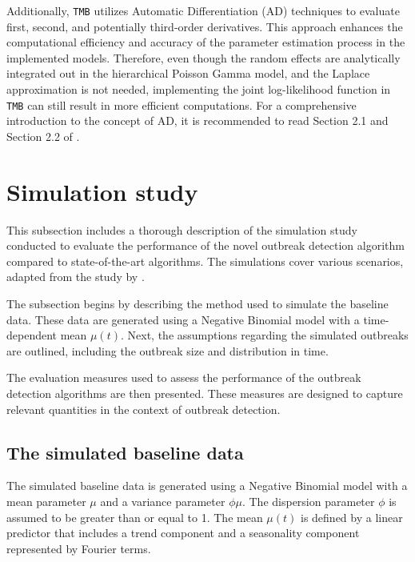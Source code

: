 \documentclass[preprint, 3p, authoryear]{elsarticle} %
\begin{document}
Additionally, \texttt{TMB} utilizes Automatic Differentiation (AD) techniques \citep{Griewank_2008} to evaluate first, second, and potentially third-order derivatives. This approach enhances the computational efficiency and accuracy of the parameter estimation process in the implemented models. Therefore, even though the random effects are analytically integrated out in the hierarchical Poisson Gamma model, and the Laplace approximation is not needed, implementing the joint log-likelihood function in \texttt{TMB} can still result in more efficient computations. For a comprehensive introduction to the concept of AD, it is recommended to read Section 2.1 and Section 2.2 of \citet{Fournier_2012}.

\hypertarget{simulation-study}{%
\section{Simulation study}\label{simulation-study}}

This subsection includes a thorough description of the simulation study conducted to evaluate the performance of the novel outbreak detection algorithm compared to state-of-the-art algorithms. The simulations cover various scenarios, adapted from the study by \citet{Noufaily_2013}.

The subsection begins by describing the method used to simulate the baseline data. These data are generated using a Negative Binomial model with a time-dependent mean \(\mu(t)\). Next, the assumptions regarding the simulated outbreaks are outlined, including the outbreak size and distribution in time.

The evaluation measures used to assess the performance of the outbreak detection algorithms are then presented. These measures are designed to capture relevant quantities in the context of outbreak detection.

\hypertarget{the-simulated-baseline-data}{%
\subsection{The simulated baseline data}\label{the-simulated-baseline-data}}

The simulated baseline data is generated using a Negative Binomial model with a mean parameter \(\mu\) and a variance parameter \(\phi\mu\). The dispersion parameter \(\phi\) is assumed to be greater than or equal to 1. The mean \(\mu(t)\) is defined by a linear predictor that includes a trend component and a seasonality component represented by Fourier terms.
\end{document}
